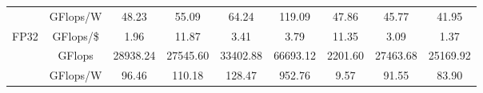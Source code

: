 \begin{table}[h]
\begin{adjustwidth}{-1.0in}{-1.0in}
\begin{center}
{\begin{tabular}{cc||c|c|c|c|c|c|c}
                                  & GFlops/W                                                                               & 48.23                                                           & 55.09                                                            & 64.24                                                                & 119.09                                                        & 47.86                                                                & 45.77                                                                  & 41.95                                                                  \\
\multirow{-3}{*}{FP32}            & \cellcolor[HTML]{EFEFEF}GFlops/\$                                                      & \cellcolor[HTML]{EFEFEF}1.96                                    & \cellcolor[HTML]{EFEFEF}11.87                                    & \cellcolor[HTML]{EFEFEF}3.41                                         & \cellcolor[HTML]{EFEFEF}3.79                                  & \cellcolor[HTML]{EFEFEF}11.35                                        & \cellcolor[HTML]{EFEFEF}3.09                                           & \cellcolor[HTML]{EFEFEF}1.37                                           \\ \hline
                                  & GFlops                                                                                 & 28938.24                                                        & 27545.60                                                         & 33402.88                                                             & 66693.12                                                      & 2201.60                                                              & 27463.68                                                               & 25169.92                                                               \\
                                  & \cellcolor[HTML]{EFEFEF}GFlops/W                                                       & \cellcolor[HTML]{EFEFEF}96.46                                   & \cellcolor[HTML]{EFEFEF}110.18                                   & \cellcolor[HTML]{EFEFEF}128.47                                       & \cellcolor[HTML]{EFEFEF}952.76                                & \cellcolor[HTML]{EFEFEF}9.57                                         & \cellcolor[HTML]{EFEFEF}91.55                                          & \cellcolor[HTML]{EFEFEF}83.90                                          \\

\end{tabular}}
\end{center}
\end{adjustwidth}
\end{table}
